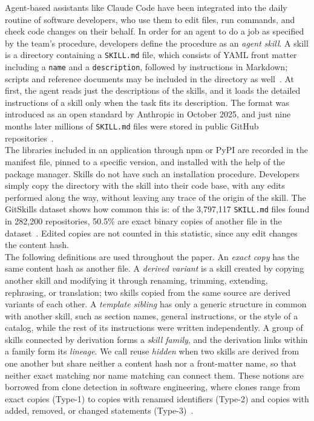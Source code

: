 \documentclass[sigconf,screen]{acmart}
\begin{document}
Agent-based assistants like Claude Code have been integrated into the daily routine of software developers, who use them to edit files, run commands, and check code changes on their behalf. In order for an agent to do a job as specified by the team's procedure, developers define the procedure as an \emph{agent skill}. A skill is a directory containing a \texttt{SKILL.md} file, which consists of YAML front matter including a \texttt{name} and a \texttt{description}, followed by instructions in Markdown; scripts and reference documents may be included in the directory as well~\cite{agentskills_spec, destefanis2027gitskills}. At first, the agent reads just the descriptions of the skills, and it loads the detailed instructions of a skill only when the task fits its description. The format was introduced as an open standard by Anthropic in October 2025, and just nine months later millions of \texttt{SKILL.md} files were stored in public GitHub repositories~\cite{destefanis2027gitskills}. \\
The libraries included in an application through npm or PyPI are recorded in the manifest file, pinned to a specific version, and installed with the help of the package manager. Skills do not have such an installation procedure. Developers simply copy the directory with the skill into their code base, with any edits performed along the way, without leaving any trace of the origin of the skill. The GitSkills dataset shows how common this is: of the 3,797,117 \texttt{SKILL.md} files found in 282,200 repositories, 50.5\% are exact binary copies of another file in the dataset~\cite{destefanis2027gitskills}. Edited copies are not counted in this statistic, since any edit changes the content hash. \\
The following definitions are used throughout the paper. An \emph{exact copy} has the same content hash as another file. A \emph{derived variant} is a skill created by copying another skill and modifying it through renaming, trimming, extending, rephrasing, or translation; two skills copied from the same source are derived variants of each other. A \emph{template sibling} has only a generic structure in common with another skill, such as section names, general instructions, or the style of a catalog, while the rest of its instructions were written independently. A group of skills connected by derivation forms a \emph{skill family}, and the derivation links within a family form its \emph{lineage}. We call reuse \emph{hidden} when two skills are derived from one another but share neither a content hash nor a front-matter name, so that neither exact matching nor name matching can connect them. These notions are borrowed from clone detection in software engineering, where clones range from exact copies (Type-1) to copies with renamed identifiers (Type-2) and copies with added, removed, or changed statements (Type-3)~\cite{roy2009comparison}. \\
\end{document}
